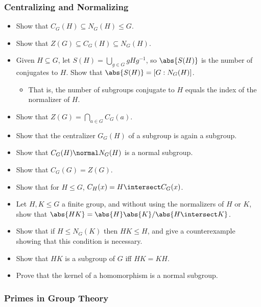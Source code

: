 \hypertarget{centralizing-and-normalizing}{%
\subsubsection{Centralizing and
Normalizing}\label{centralizing-and-normalizing}}

\begin{itemize}
\item
  Show that \(C_G(H) \subseteq N_G(H) \leq G\).
\item
  Show that \(Z(G) \subseteq C_G(H) \subseteq N_G(H)\).
\item
  Given \(H\subseteq G\), let \(S(H)= \bigcup_{g\in G} gHg^{-1}\), so
  \(\abs{S(H)}\) is the number of conjugates to \(H\). Show that
  \(\abs{S(H)} = [G : N_G(H)]\).

  \begin{itemize}
  \tightlist
  \item
    That is, the number of subgroups conjugate to \(H\) equals the index
    of the normalizer of \(H\).
  \end{itemize}
\item
  Show that \(Z(G) = \bigcap_{a\in G} C_G(a)\).
\item
  Show that the centralizer \(G_G(H)\) of a subgroup is again a
  subgroup.
\item
  Show that \(C_G(H) \normal N_G(H)\) is a normal subgroup.
\item
  Show that \(C_G(G) = Z(G)\).
\item
  Show that for \(H\leq G\), \(C_H(x) = H \intersect C_G(x)\).
\item
  Let \(H, K \leq G\) a finite group, and without using the normalizers
  of \(H\) or \(K\), show that
  \(\abs{HK} = \abs{H} \abs{K}/\abs{H\intersect K}\).
\item
  Show that if \(H \leq N_G(K)\) then \(HK \leq H\), and give a
  counterexample showing that this condition is necessary.
\item
  Show that \(HK\) is a subgroup of \(G\) iff \(HK = KH\).
\item
  Prove that the kernel of a homomorphism is a normal subgroup.
\end{itemize}

\hypertarget{primes-in-group-theory}{%
\subsubsection{Primes in Group Theory}\label{primes-in-group-theory}}

